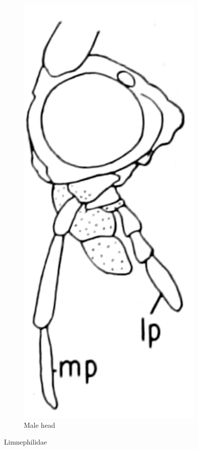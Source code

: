 \documentclass[letterpaper, 11pt]{article}
\begin{document}
\begin{figure}[ht!]
\begin{subfigure}[ht!]{0.15\textwidth}
        \includegraphics[width=\textwidth]{LimnephilidHead}
        \caption{Male head \citep[][Fig. 65]{bhl50956}}
        \label{fig:limnephilid2}
    \end{subfigure}
    \caption{Limnephilidae}\label{fig:limnephilids}
\end{figure}
\end{document}
